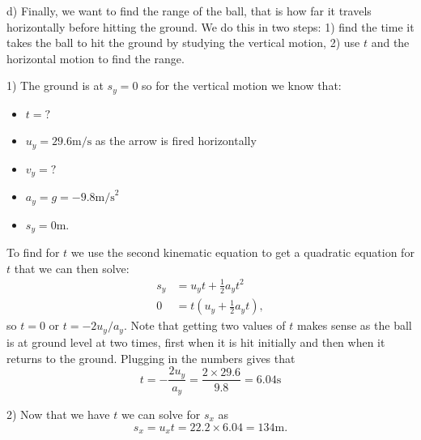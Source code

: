 d) Finally, we want to find the range of the ball, that is how far it travels horizontally before hitting the ground. We do this in two steps: 1) find the time it takes the ball to hit the ground by studying the vertical motion, 2) use $t$ and the horizontal motion to find the range.

1) The ground is at $s_{y}=0$ so for the vertical motion we know that:
\begin{itemize}
\setlength{\itemsep}{-5pt}
    \item $t=?$
\item $u_{y}=29.6\text{m/s}$ as the arrow is fired horizontally
\item $v_{y}=?$
\item $a_{y}=g=-9.8\text{m/s}^{2}$
\item $s_{y}=0$m.
\end{itemize}
To find for $t$ we use the second kinematic equation to get a quadratic equation for $t$ that we can then solve:
\begin{align*}
s_{y}&=u_{y}t+\frac{1}{2}a_{y}t^{2}\\
0&=t\left(u_{y}+\frac{1}{2}a_{y}t\right),
\end{align*}
so $t=0$ or $t=-2u_{y}/a_{y}$. Note that getting two values of $t$ makes sense as the ball is at ground level at two times, first when it is hit initially and then when it returns to the ground.  Plugging in the numbers gives that
\begin{equation*}
t=-\frac{2u_{y}}{a_{y}}=\frac{2\times 29.6}{9.8}=6.04\text{s}
\end{equation*}

2) Now that we have $t$ we can solve for $s_{x}$ as
\begin{equation*}
s_{x}=u_{x}t=22.2\times 6.04 =134\text{m}.
\end{equation*}
